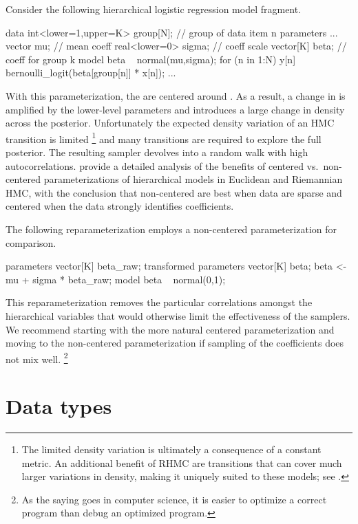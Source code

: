 \documentclass[article]{jss}
\begin{document}
Consider the following hierarchical logistic regression model fragment.
%
\begin{Code}
data {
  int<lower=1,upper=K> group[N];  // group of data item n
}  
parameters {
  ...
  vector mu;             // mean coeff
  real<lower=0> sigma;   // coeff scale
  vector[K] beta;        // coeff for group k
}
model {
  beta ~ normal(mu,sigma);
  for (n in 1:N)
    y[n] ~ bernoulli_logit(beta[group[n]] * x[n]);
  ...
}
\end{Code}
%
With this parameterization, the  are centered around
.  As a result, a change in  is amplified by the
lower-level parameters and introduces a large change in density across
the posterior.  Unfortunately the expected density variation of an HMC
transition is limited%
%
\footnote{The limited density variation is ultimately a consequence of
  a constant metric.  An additional benefit of RHMC are transitions
  that can cover much larger variations in density, making it uniquely
  suited to these models; see \citep{Neal:2011}.}
%
and many transitions are required to explore the full posterior.  The
resulting sampler devolves into a random walk with high
autocorrelations.  \cite{BetancourtGirolami:2013} provide a detailed
analysis of the benefits of centered vs.\ non-centered
parameterizations of hierarchical models in Euclidean and Riemannian
HMC, with the conclusion that non-centered are best when data are
sparse and centered when the data strongly identifies coefficients.

The following reparameterization employs a non-centered
parameterization for comparison.
%
\begin{Code}
parameters {
  vector[K] beta_raw;    
}
transformed parameters {
  vector[K] beta;
  beta <- mu + sigma * beta_raw;
}
model {
  beta ~ normal(0,1);
}
\end{Code}
%
This reparameterization removes the particular correlations amongst the
hierarchical variables that would otherwise limit the effectiveness
of the samplers.  We recommend starting with the more natural centered
parameterization and moving to the non-centered parameterization if
sampling of the coefficients does not mix well.%
%
\footnote{As the saying goes in computer science, it is easier to
  optimize a correct program than debug an optimized program.}

\section{Data types}
\end{document}
